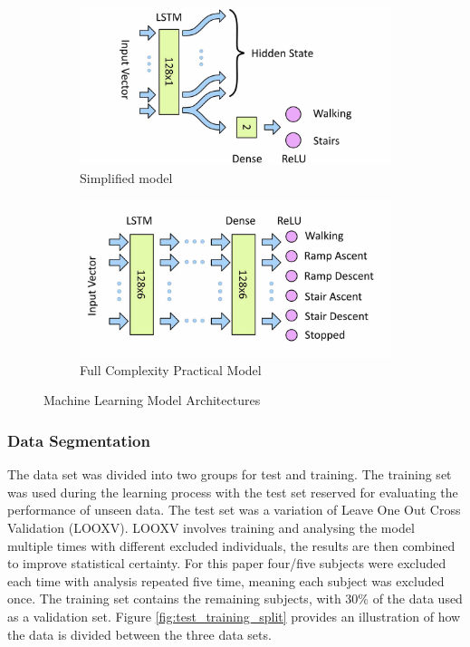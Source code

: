 \documentclass[sensors,article,submit,moreauthors,pdftex]{Definitions/mdpi}
\begin{document}
\begin{figure}[!hbt]
    \centering
        \begin{subfigure}[b]{0.49\textwidth}
        \centering
        \includegraphics[width=\textwidth]{Figures/lstm/Simplified_Network.jpg}
        \caption{Simplified model}
        \label{subfig:simplfied_lstm_model}
    \end{subfigure}
    \hfill
    \begin{subfigure}[b]{0.49\textwidth}
        \centering
        \includegraphics[width=\textwidth]{Figures/lstm/LSTM_Network.jpg}
        \caption{Full Complexity Practical Model}
        \label{subfig:full_lstm_model}
    \end{subfigure}
    \caption{Machine Learning Model Architectures}
    \label{fig:ml_models}
\end{figure}

\subsubsection{Data Segmentation}
The data set was divided into two groups for test and training. The training set was used during the learning process with the test set reserved for evaluating the performance of unseen data. The test set was a variation of Leave One Out Cross Validation (LOOXV). LOOXV involves training and analysing the model multiple times with different excluded individuals, the results are then combined to improve statistical certainty. For this paper four/five subjects were excluded each time with analysis repeated five time, meaning each subject was excluded once. The training set contains the remaining subjects, with 30\% of the data used as a validation set. Figure \ref{fig:test_training_split} provides an illustration of how the data is divided between the three data sets.
\end{document}
